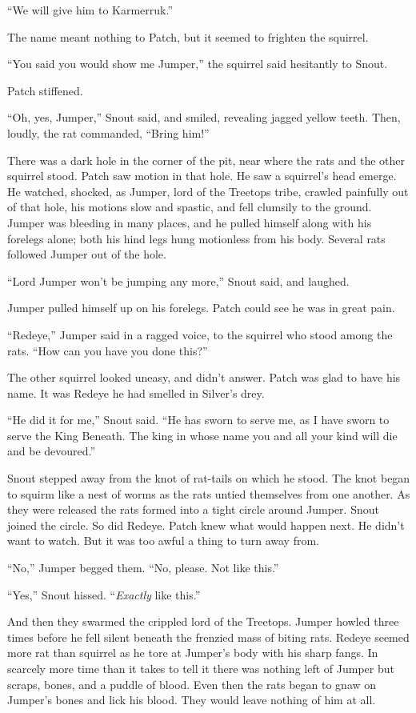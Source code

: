 \documentclass[ebook,oneside,openany,17pt]{memoir}
\newenvironment{tolerant}[1]{%
  \par\tolerance=#1\relax
}{%
  \par
}
\begin{document}
“We will give him to Karmerruk.”

The name meant nothing to Patch, but it seemed to frighten the
squirrel.

“You said you would show me Jumper,” the squirrel said hesitantly to
Snout.

Patch stiffened.

\begin{tolerant}{500}
“Oh, yes, Jumper,” Snout said, and smiled, revealing jagged yellow
teeth. Then, loudly, the rat commanded, “Bring him!”
\end{tolerant}

There was a dark hole in the corner of the pit, near where the rats
and the other squirrel stood. Patch saw motion in that hole. He saw a
squirrel’s head emerge. He watched, shocked, as Jumper, lord of the
Treetops tribe, crawled painfully out of that hole, his motions slow
and spastic, and fell clumsily to the ground. Jumper was bleeding in
many places, and he pulled himself along with his forelegs alone; both
his hind legs hung motionless from his body. Several rats followed
Jumper out of the hole.

“Lord Jumper won’t be jumping any more,” Snout said, and laughed.

Jumper pulled himself up on his forelegs. Patch could see he was in
great pain.

“Redeye,” Jumper said in a ragged voice, to the squirrel who stood
among the rats. “How can you have you done this?”

The other squirrel looked uneasy, and didn’t answer. Patch was glad to
have his name. It was Redeye he had smelled in Silver’s drey.

“He did it for me,” Snout said. “He has sworn to serve me, as I have
sworn to serve the King Beneath. The king in whose name you and all
your kind will die and be devoured.”

Snout stepped away from the knot of rat-tails on which he stood. The
knot began to squirm like a nest of worms as the rats untied
themselves from one another. As they were released the rats formed
into a tight circle around Jumper. Snout joined the circle. So did
Redeye. Patch knew what would happen next. He didn’t want to
watch. But it was too awful a thing to turn away from.

“No,” Jumper begged them. “No, please. Not like this.”

“Yes,” Snout hissed. “\emph{Exactly} like this.”

\begin{tolerant}{500}
And then they swarmed the crippled lord of the Treetops. Jumper howled
three times before he fell silent beneath the frenzied mass of biting
rats. Redeye seemed more rat than squirrel as he tore at Jump\-er’s body
with his sharp fangs. In scarcely more time than it takes to tell it
there was nothing left of Jump\-er but scraps, bones, and a puddle of
blood. Even then the rats began to gnaw on Jumper’s bones and lick his
blood. They would leave nothing of him at all.
\end{tolerant}
\end{document}

